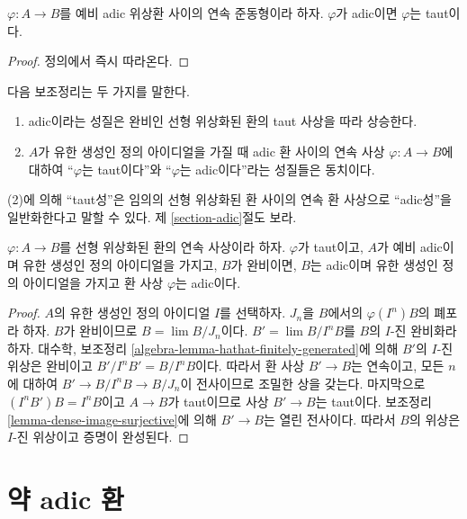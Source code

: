 \begin{lemma}
\label{lemma-adic-taut}
$\varphi : A \to B$를 예비 adic 위상환 사이의 연속 준동형이라 하자.
$\varphi$가 adic이면 $\varphi$는 taut이다.
\end{lemma}

\begin{proof}
정의에서 즉시 따라온다.
\end{proof}

\noindent
다음 보조정리는 두 가지를 말한다.
\begin{enumerate}
\item adic이라는 성질은 완비인 선형 위상화된 환의 taut 사상을 따라
상승한다.
\item $A$가 유한 생성인 정의 아이디얼을 가질 때 adic 환 사이의
연속 사상 $\varphi : A \to B$에 대하여 ``$\varphi$는 taut이다''와
``$\varphi$는 adic이다''라는 성질들은 동치이다.
\end{enumerate}
(2)에 의해 ``taut성''은 임의의 선형 위상화된 환 사이의 연속 환
사상으로 ``adic성''을 일반화한다고 말할 수 있다. 제
\ref{section-adic}절도 보라.

\begin{lemma}
\label{lemma-taut-is-adic}
$\varphi : A \to B$를 선형 위상화된 환의 연속 사상이라 하자.
$\varphi$가 taut이고, $A$가 예비 adic이며 유한 생성인 정의
아이디얼을 가지고, $B$가 완비이면, $B$는 adic이며 유한 생성인
정의 아이디얼을 가지고 환 사상 $\varphi$는 adic이다.
\end{lemma}

\begin{proof}
$A$의 유한 생성인 정의 아이디얼 $I$를 선택하자. $J_n$을
$B$에서의 $\varphi(I^n)B$의 폐포라 하자. $B$가 완비이므로
$B = \lim B/J_n$이다. $B' = \lim B/I^nB$를 $B$의 $I$-진
완비화라 하자. 대수학, 보조정리
\ref{algebra-lemma-hathat-finitely-generated}에 의해 $B'$의 $I$-진
위상은 완비이고 $B'/I^nB' = B/I^nB$이다. 따라서 환 사상
$B' \to B$는 연속이고, 모든 $n$에 대하여
$B' \to B/I^nB \to B/J_n$이 전사이므로 조밀한 상을 갖는다.
마지막으로 $(I^nB')B = I^nB$이고 $A \to B$가 taut이므로
사상 $B' \to B$는 taut이다. 보조정리
\ref{lemma-dense-image-surjective}에 의해 $B' \to B$는 열린
전사이다. 따라서 $B$의 위상은 $I$-진 위상이고 증명이 완성된다.
\end{proof}









\section{약 adic 환}
\label{section-weakly-adic}

